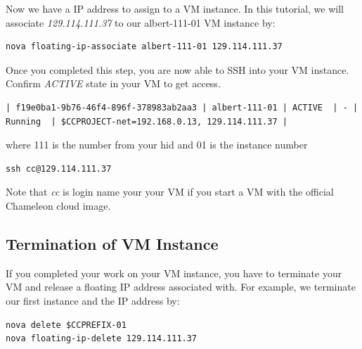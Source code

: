 Now we have a IP address to assign to a VM instance. In this tutorial,
we will associate \textit{129.114.111.37} to our
albert-111-01 VM instance by:

\begin{lstlisting}
nova floating-ip-associate albert-111-01 129.114.111.37
\end{lstlisting}

Once you completed this step, you are now able to SSH into your VM
instance.  Confirm \textit{ACTIVE} state in your VM to get access.

\begin{tiny}
\begin{lstlisting}
| f19e0ba1-9b76-46f4-896f-378983ab2aa3 | albert-111-01 | ACTIVE  | - | Running  | $CCPROJECT-net=192.168.0.13, 129.114.111.37 |
\end{lstlisting}
\end{tiny}

where 111 is the number from your hid and 01 is the instance number

\begin{lstlisting}
ssh cc@129.114.111.37
\end{lstlisting}

Note that \textit{cc} is login name your your VM if you start a VM
with the official Chameleon cloud image.

\subsection{Termination of VM Instance}

If you completed your work on your VM instance, you have to terminate
your VM and release a floating IP address associated with. For
example, we terminate our first instance and the IP address by:

\begin{lstlisting}
nova delete $CCPREFIX-01
nova floating-ip-delete 129.114.111.37
\end{lstlisting}



